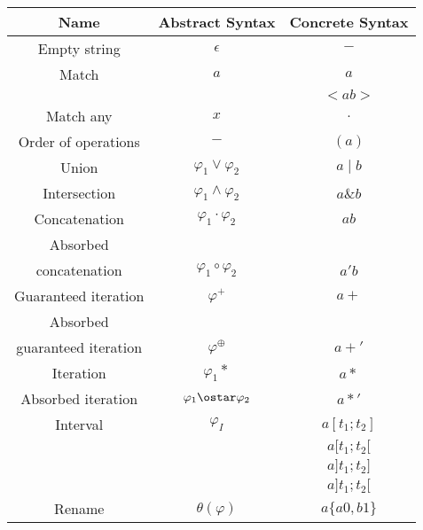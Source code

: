 \begin{tabular}{ |c|c|c| }
    \hline
    \textbf{Name}        & \textbf{Abstract Syntax}   & \textbf{Concrete Syntax} \\
    \hline
    Empty string         & $\epsilon$                 & $-$                      \\
    \hline
    Match                & $a$                        & $a$                      \\
                         &                            & $<ab>$                   \\
    \hline
    Match any            & $x$                        & $.$                      \\
    \hline
    Order of operations  & $-$                        & $(a)$                    \\
    \hline
    Union                & $\varphi_1\vee\varphi_2$   & $a \mid b$               \\
    \hline
    Intersection         & $\varphi_1\wedge\varphi_2$ & $a\&b$                   \\
    \hline
    Concatenation        & $\varphi_1\cdot\varphi_2$  & $ab$                     \\
    \hline
    Absorbed             &                            &                          \\
    concatenation        & $\varphi_1\circ\varphi_2$  & $a'b$                    \\
    \hline
    Guaranteed iteration & $\varphi^+$                & $a+$                     \\
    \hline
    Absorbed             &                            &                          \\
    guaranteed iteration & $\varphi^\oplus$           & $a+'$                    \\
    \hline
    Iteration            & $\varphi_1*$               & $a*$                     \\
    \hline
    Absorbed iteration   & $\varphi_1\ostar\varphi_2$ & $a*'$                    \\
    \hline
    Interval             & $\varphi_I$                & $a[t_1;t_2]$             \\
                         &                            & $a[t_1;t_2[$             \\
                         &                            & $a]t_1;t_2]$             \\
                         &                            & $a]t_1;t_2[$             \\
    \hline
    Rename               & $\theta(\varphi)$          & $a\{a0,b1\}$             \\
    \hline
\end{tabular}